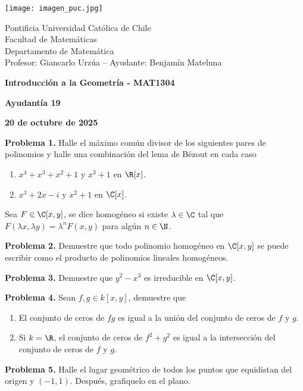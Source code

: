 \documentclass{article}
\begin{document}
\begin{minipage}{2.5cm}
    \texttt{[image: imagen\_puc.jpg]}
\end{minipage}
\begin{minipage}{14cm}
    {\sc Pontificia Universidad Católica de Chile\\
    Facultad de Matemáticas\\
    Departamento de Matemática\\
    Profesor: Giancarlo Urzúa -- Ayudante: Benjamín Mateluna}
\end{minipage}
\vspace{1ex}

{\centerline{\bf Introducción a la Geometría - MAT1304}
\centerline{\bf Ayudantía 19}}
\centerline{\bf 20 de octubre de 2025}

\vspace{1cm}
\noindent\textbf{Problema 1.} Halle el máximo común divisor de los siguientes pares de polinomios
y halle una combinación del lema de Bézout en cada caso

\begin{enumerate}
    \item $x^{4}+x^{3}+x^{2}+1$ y $x^{3}+1$ en $\R[x]$.
    
    \item $x^{3}+2x-i$ y $x^{2}+1$ en $\C[x]$.
\end{enumerate}

\begin{dfn}
    Sea $F\in\C[x,y]$, se dice homogéneo si existe $\lambda\in\C$ tal que 
    $F(\lambda x,\lambda y)=\lambda^{n}F(x,y)$ para algún $n\in\N$.
\end{dfn}

\vspace{5mm}
\noindent\textbf{Problema 2.} Demuestre que todo polinomio homogéneo en $\C[x,y]$ se puede 
escribir como el producto de polinomios lineales homogéneos.

\vspace{5mm}
\noindent\textbf{Problema 3.} Demuestre que $y^{2}-x^{3}$ es irreducible en $\C[x,y]$.

\vspace{5mm}
\noindent\textbf{Problema 4.} Sean $f,g\in k[x,y]$, demuestre que
\begin{enumerate}
    \item El conjunto de ceros de $fg$ es igual a la unión del conjunto de ceros de $f$ y $g$.
    \item Si $k=\R$, el conjunto de ceros de $f^{2}+g^{2}$ es igual a la intersección del conjunto 
    de ceros de $f$ y $g$.
\end{enumerate}

\vspace{5mm}
\noindent\textbf{Problema 5.} Halle el lugar geométrico de todos los puntos que equidistan del
origen y $(-1,1)$. Después, grafiquelo en el plano.

\end{document}
